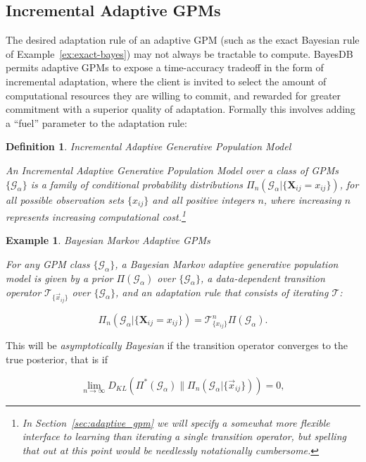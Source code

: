 \documentclass[10pt,letterpaper]{article}
\newtheorem{example}{Example}[section]
\newtheorem{definition}{Definition}[section]
\newcommand{\set}[1]{\{#1\}}
\newcommand{\G}{\mathcal{G}}
\newcommand{\T}{\mathcal{T}}
\begin{document}
\subsection{Incremental Adaptive GPMs}

The desired adaptation rule of an adaptive GPM (such as the exact
Bayesian rule of Example~\ref{ex:exact-bayes}) may not always be
tractable to compute.  BayesDB permits adaptive GPMs to expose a
time-accuracy tradeoff in the form of incremental adaptation, where
the client is invited to select the amount of computational resources
they are willing to commit, and rewarded for greater commitment with a
superior quality of adaptation.  Formally this involves adding a ``fuel''
parameter to the adaptation rule:

\begin{definition} Incremental Adaptive Generative Population Model
\label{def:incremental-adaptive}

An \emph{Incremental Adaptive Generative Population Model} over a
class of GPMs $\{\G_\alpha\}$ is a family of conditional probability
distributions $\Pi_n(\G_\alpha|\set{\mathbf{X}_{ij} = x_{ij}})$, for all
possible observation sets $\{x_{ij}\}$ and all positive integers $n$,
where increasing $n$ represents increasing computational
cost.\footnote{In Section~\ref{sec:adaptive_gpm} we will specify a
  somewhat more flexible interface to learning than iterating a single
  transition operator, but spelling that out at this point would be
  needlessly notationally cumbersome.}
\end{definition}

\begin{example} Bayesian Markov Adaptive GPMs

For any GPM class $\{\G_\alpha\}$, a \emph{Bayesian Markov adaptive
  generative population model} is given by a prior
$\Pi(\G_\alpha)$ over
$\{\G_\alpha\}$, a data-dependent transition operator
$\T_{\{\vec{x}_{ij}\}}$ over $\{\G_\alpha\}$, and
an adaptation rule that consists of iterating $\T$:

\[ \Pi_n(\G_\alpha|\set{\mathbf{X}_{ij} = x_{ij}}) = \T_{\set{x_{ij}}}^n 
\Pi(\G_\alpha). \]
\label{ex:markov-bayes}
\end{example}

This will be \emph{asymptotically Bayesian} if the transition operator
converges to the true posterior, that is if

\[ \lim_{n\to\infty}D_{KL}(\Pi^*(\G_\alpha) \| \Pi_n(\G_\alpha|\{\vec{x}_{ij}\})) = 0, \]
\end{document}
